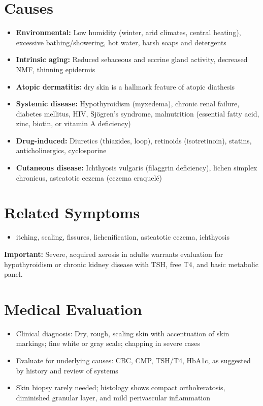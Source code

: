 \section*{Causes}
\begin{itemize}
  \item \textbf{Environmental:} Low humidity (winter, arid climates, central heating), excessive bathing/showering, hot water, harsh soaps and detergents
  \item \textbf{Intrinsic aging:} Reduced sebaceous and eccrine gland activity, decreased NMF, thinning epidermis
  \item \textbf{Atopic dermatitis:} dry skin is a hallmark feature of atopic diathesis
  \item \textbf{Systemic disease:} Hypothyroidism (myxedema), chronic renal failure, diabetes mellitus, HIV, Sj\"ogren's syndrome, malnutrition (essential fatty acid, zinc, biotin, or vitamin A deficiency)
  \item \textbf{Drug-induced:} Diuretics (thiazides, loop), retinoids (isotretinoin), statins, anticholinergics, cyclosporine
  \item \textbf{Cutaneous disease:} Ichthyosis vulgaris (filaggrin deficiency), lichen simplex chronicus, asteatotic eczema (eczema craquel\'e)
\end{itemize}

\section*{Related Symptoms}
\begin{itemize}
  \item itching, scaling, fissures, lichenification, asteatotic eczema, ichthyosis
\end{itemize}
\textbf{Important:} Severe, acquired xerosis in adults warrants evaluation for hypothyroidism or chronic kidney disease with TSH, free T4, and basic metabolic panel.

\section*{Medical Evaluation}
\begin{itemize}
  \item Clinical diagnosis: Dry, rough, scaling skin with accentuation of skin markings; fine white or gray scale; chapping in severe cases
  \item Evaluate for underlying causes: CBC, CMP, TSH/T4, HbA1c, as suggested by history and review of systems
  \item Skin biopsy rarely needed; histology shows compact orthokeratosis, diminished granular layer, and mild perivascular inflammation
\end{itemize}

